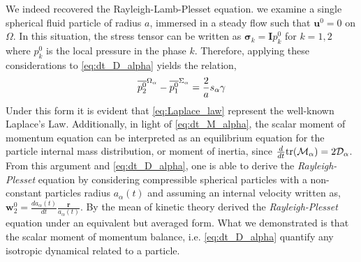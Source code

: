We indeed recovered the Rayleigh-Lamb-Plesset equation. 
 we examine a single spherical fluid particle of radius $a$, immersed in a steady flow such that $\textbf{u}^0 = 0$ on $\Omega$. 
In this situation, the stress tensor can be written as $\bm{\sigma}_k = \textbf{I} p_k^0$ for $k = 1, 2$ where $p_k^0$ is the local pressure in the phase $k$. 
Therefore, applying these considerations to \ref{eq:dt_D_alpha} yields the relation, 
\begin{equation*}
    \overline{p_2^0}^{\Omega_\alpha} 
    - \overline{p_1^0}^{\Sigma_\alpha}
    =
    \frac{2}{a} s_\alpha \gamma
    \label{eq:Laplace_law}
\end{equation*}
Under this form it is evident that \ref{eq:Laplace_law} represent the well-known Laplace's Law. 
Additionally, in light of \ref{eq:dt_M_alpha}, the scalar moment of momentum equation can be interpreted as an equilibrium equation for the particle internal mass distribution, or moment of inertia, since $\frac{d}{d t}{\text{tr}(\mathcal{M}_\alpha)} = 2 \mathcal{D}_\alpha$. 
From this argument and \ref{eq:dt_D_alpha}, one is able to derive the \textit{Rayleigh-Plesset} equation by considering compressible spherical particles with a non-constant particles radius $a_\alpha(t)$ and assuming an internal velocity written as, $\textbf{w}^0_2 = \frac{d a_\alpha(t)}{dt}  \frac{\textbf{r}}{a_\alpha(t)}$. 
By the mean of kinetic theory \citet{zhang1994averaged} derived the \textit{Rayleigh-Plesset} equation under an equivalent but averaged form.
What we demonstrated is that the scalar moment of momentum balance, i.e. \ref{eq:dt_D_alpha} quantify any isotropic dynamical related to a particle. 


